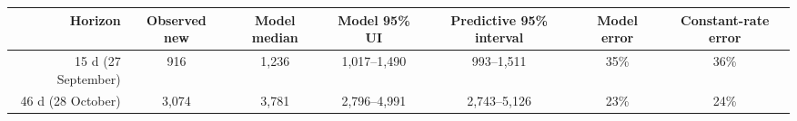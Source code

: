 \begin{tabular}{@{}rcccccc@{}}
\toprule
Horizon & Observed new & Model median & Model 95\% UI & Predictive 95\% interval & Model error & Constant-rate error \\
\midrule
15 d (27 September) & 916 & 1,236 & 1,017--1,490 & 993--1,511 & 35\% & 36\% \\
46 d (28 October) & 3,074 & 3,781 & 2,796--4,991 & 2,743--5,126 & 23\% & 24\% \\
\bottomrule
\end{tabular}
